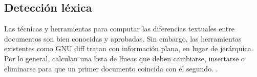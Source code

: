 \subsection{Detección léxica}
Las técnicas y herramientas para computar las diferencias textuales entre documentos son bien conocidas y aprobadas. Sin embargo, las herramientas existentes como GNU diff tratan con información plana, en lugar de jerárquica. Por lo general, calculan una lista de líneas que deben cambiarse, insertarse o eliminarse para que un primer documento coincida con el segundo. \cite{ChangeDistiller}.